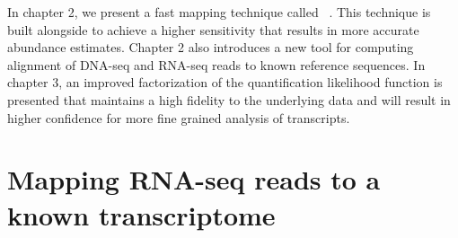 In chapter 2, we present a fast mapping technique called \sla~\citep{selaln}. 
This technique is built alongside \qm to achieve a higher sensitivity that results in more 
accurate abundance estimates. Chapter 2 also introduces a new tool for 
computing alignment of DNA-seq and RNA-seq reads to known reference sequences. 
In chapter 3, an improved factorization of the quantification likelihood 
function is presented that maintains a high fidelity to the underlying 
data and will result in higher confidence for more fine grained analysis 
of transcripts. 

\section{Mapping RNA-seq reads to a known transcriptome}


